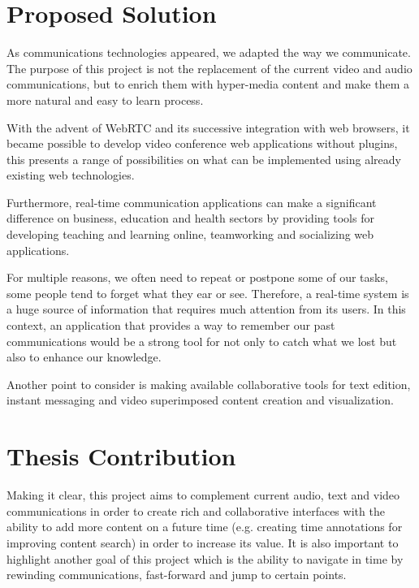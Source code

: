 \section{Proposed Solution}
\label{section:proposed}

	As communications technologies appeared, we adapted the way we communicate. {\color{blue} The purpose of this project is not the replacement of} the current video and audio communications, but to enrich them with hyper-media content and make them a more natural and easy to learn process. 

	{\color{blue}With the advent of WebRTC and its successive integration with web browsers, it became possible to develop video conference web applications without plugins, this presents a range of possibilities on what can be implemented using already existing web technologies.}
		
    Furthermore, real-time communication applications can make a significant difference on business, education and health sectors by providing tools for developing teaching and learning online, teamworking and socializing web applications.

	For multiple reasons, we often need to repeat or postpone some of our tasks, some people tend to forget what they ear or see.
	Therefore, a real-time system is a huge source of information that requires much attention from its users. In this context, an application that provides a way to remember our past communications would be a strong tool for not only to catch what we lost but also to enhance our knowledge.


	{\color{blue}Another point to consider is making available collaborative tools for text edition, instant messaging and video superimposed content creation and visualization.}


\section{Thesis Contribution}
\label{section:contribution}

	Making it clear, this project aims to complement current audio, text and video communications in order to create rich and collaborative interfaces with the ability to add more content on a future time (e.g. creating time annotations for improving content search) in order to increase its value. It is also important to highlight another goal of this project which is the ability to navigate in time by rewinding communications, fast-forward and jump to certain points.

